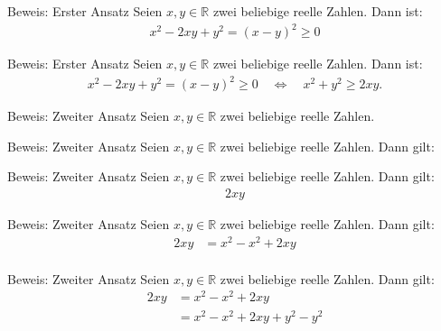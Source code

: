 \documentclass[10pt]{beamer}
\def\bR{\mathbb{R}}
\begin{document}
\begin{frame}{Beweis: Erster Ansatz}
    Seien \( x, y \in \bR \) zwei beliebige reelle Zahlen. Dann ist:
    \begin{align*}
        x^{2} - 2xy + y^{2}
        = \left( x - y \right)^{2}
        \geq 0  
    \end{align*}
\end{frame}



\begin{frame}{Beweis: Erster Ansatz}
    Seien \( x, y \in \bR \) zwei beliebige reelle Zahlen. Dann ist:
    \begin{align*}
        x^{2} - 2xy + y^{2}
        = \left( x - y \right)^{2}
        \geq 0
        \quad \Leftrightarrow \quad x^{2} + y^{2} \geq 2xy.
    \end{align*}
\end{frame}



\begin{frame}{Beweis: Zweiter Ansatz}
    Seien \( x, y \in \bR \) zwei beliebige reelle Zahlen.
\end{frame}



\begin{frame}{Beweis: Zweiter Ansatz}
    Seien \( x, y \in \bR \) zwei beliebige reelle Zahlen. Dann gilt:
\end{frame}



\begin{frame}{Beweis: Zweiter Ansatz}
    Seien \( x, y \in \bR \) zwei beliebige reelle Zahlen. Dann gilt:
    \begin{align*}
        2xy
    \end{align*}
\end{frame}



\begin{frame}{Beweis: Zweiter Ansatz}
    Seien \( x, y \in \bR \) zwei beliebige reelle Zahlen. Dann gilt:
    \begin{align*}
        2xy
        & = x^{2} - x^{2} + 2xy \\
    \end{align*}
\end{frame}



\begin{frame}{Beweis: Zweiter Ansatz}
    Seien \( x, y \in \bR \) zwei beliebige reelle Zahlen. Dann gilt:
    \begin{align*}
        2xy
        & = x^{2} - x^{2} + 2xy \\
        & = x^{2} - x^{2} + 2xy + y^{2} - y^{2} \\
    \end{align*}
\end{frame}
\end{document}
